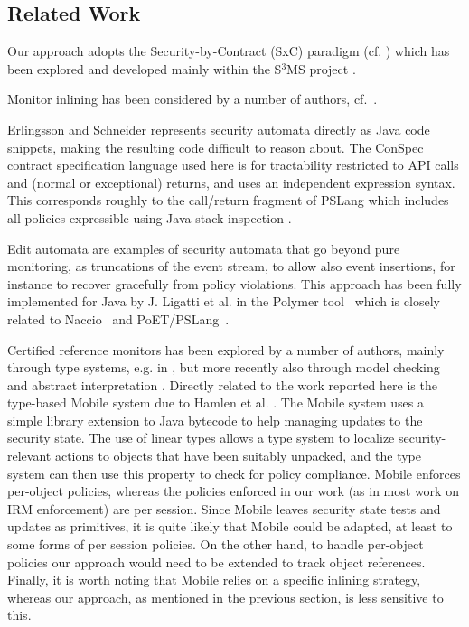 \documentclass[10pt,twocolumn]{article}
\begin{document}
\subsection{Related Work}
Our approach adopts the Security-by-Contract (SxC) para\-digm (cf. \cite{Bielova2009340,DraMasNalSia07,Desmet200825,javamac,javamop}) which has been explored and developed mainly within the S$^3$MS project \cite{s3ms}.

Monitor inlining has been considered by a number of authors, cf.~\cite{ErlSch00,ErlSchb00,Erli04,AktDamGur08,VanPie08}.

Erlingsson and Schneider \cite{ErlSchb00} represents security automata directly as Java code snippets, making the resulting code difficult to reason about. The ConSpec contract specification language used here is for tractability restricted to API calls and (normal or exceptional) returns, and uses an independent expression syntax. This corresponds roughly to the call/return fragment of PSLang which includes all policies expressible using Java stack inspection \cite{ErlSch00}.



Edit automata \cite{LigBauWal05,Lig06} are examples of security automata that go beyond pure monitoring, as truncations of the event stream, to allow also event insertions, for instance to recover gracefully from policy violations. This approach has been fully implemented for Java by J. Ligatti et al. in the Polymer tool~\cite{BauLig05} which is closely related to Naccio~\cite{EvaTwy99} and PoET/PSLang~\cite{ErlSchb00}.

Certified reference monitors has been explored by a number of authors, mainly through type systems, e.g. in \cite{SkalkaSmith04,Bauer02typesand,Wal00,HamMor06,RobMan01}, but more recently also through model checking and abstract interpretation \cite{Srid10,Sridb10}. Directly related to the work reported here is the type-based Mobile system due to Hamlen et al. \cite{HamMor06}. The Mobile system uses a simple library extension to Java bytecode to help managing updates to the security state. The use of linear types allows a type system to localize security-relevant actions to objects that have been suitably unpacked, and the type system can then use this property to check for policy compliance. Mobile enforces per-object policies, whereas the policies enforced in our work (as in most work on IRM enforcement) are per session. Since Mobile leaves security state tests and updates as primitives, it is quite likely that Mobile could be adapted, at least to some forms of per session policies. On the other hand, to handle per-object policies our approach would need to be extended to track object references. Finally, it is worth noting that Mobile relies on a specific inlining strategy, whereas our approach, as mentioned in the previous section, is less sensitive to this.
\end{document}
